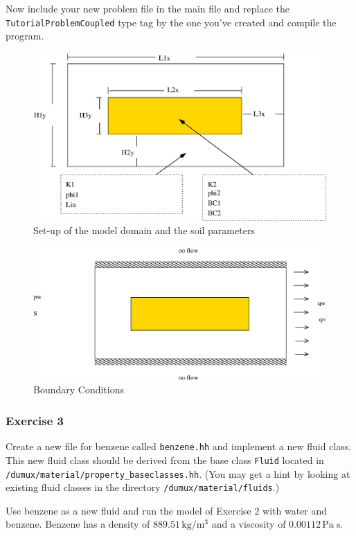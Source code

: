 Now include your new problem file in the main file and replace the
\texttt{TutorialProblemCoupled} type tag by the one you've created and
compile the program.


\begin{figure}[h]
\centering
\includegraphics[width=0.8\linewidth,keepaspectratio]{EPS/Ex2_Domain.eps}
\caption{Set-up of the model domain and the soil parameters}\label{tutorial-coupled:ex2_Domain}
\end{figure}

\begin{figure}[h]
\centering
\includegraphics[width=0.8\linewidth,keepaspectratio]{EPS/Ex2_Boundary.eps}
\caption{Boundary Conditions}\label{tutorial-coupled:ex2_BC}
\end{figure}

\subsubsection{Exercise 3}

Create a new file for benzene called \texttt{benzene.hh} and implement
a new fluid class. This new fluid class should be derived from the
base class \texttt{Fluid} located in
\texttt{/dumux/material/property\_baseclasses.hh}.  (You may get a
hint by looking at existing fluid classes in the directory
\texttt{/dumux/material/fluids}.)

Use benzene as a new fluid and run the model of Exercise 2 with water
and benzene. Benzene has a density of $889.51 \, \text{kg} / \text{m}^3$
and a viscosity of $0.00112 \, \text{Pa} \; \text{s}$. 

